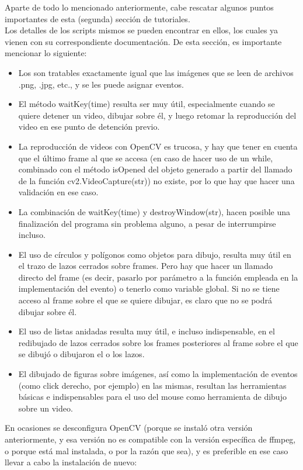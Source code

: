 \documentclass[letter]{article}
\begin{document}
Aparte de todo lo mencionado anteriormente, cabe rescatar algunos puntos importantes de esta (segunda) sección de tutoriales.\\
Los detalles de los scripts mismos se pueden encontrar en ellos, los cuales ya vienen con su correspondiente documentación. De esta sección, es importante mencionar lo siguiente:
\begin{itemize}
\item Los son tratables exactamente igual que las imágenes que se leen de archivos .png, .jpg, etc., y se les puede asignar eventos.
\item El método waitKey(time) resulta ser muy útil, especialmente cuando se quiere detener un video, dibujar sobre él, y luego retomar la reproducción del video en ese punto de detención previo.
\item La reproducción de videos con OpenCV es trucosa, y hay que tener en cuenta que el último frame al que se accesa (en caso de hacer uso de un while, combinado con el método isOpened del objeto generado a partir del llamado de la función cv2.VideoCapture(str)) no existe, por lo que hay que hacer una validación en ese caso.
\item La combinación de waitKey(time) y destroyWindow(str), hacen posible una finalización del programa sin problema alguno, a pesar de interrumpirse incluso.
\item El uso de círculos y polígonos como objetos para dibujo, resulta muy útil en el trazo de lazos cerrados sobre frames. Pero hay que hacer un llamado directo del frame (es decir, pasarlo por parámetro a la función empleada en la implementación del evento) o tenerlo como variable global. Si no se tiene acceso al frame sobre el que se quiere dibujar, es claro que no se podrá dibujar sobre él.
\item El uso de listas anidadas resulta muy útil, e incluso indispensable, en el redibujado de lazos cerrados sobre los frames posteriores al frame sobre el que se dibujó o dibujaron el o los lazos.
\item El dibujado de figuras sobre imágenes, así como la implementación de eventos (como click derecho, por ejemplo) en las mismas, resultan las herramientas básicas e indispensables para el uso del mouse como herramienta de dibujo sobre un video.
\end{itemize}

En ocasiones se desconfigura OpenCV (porque se instaló otra versión anteriormente, y esa versión no es compatible con la versión específica de ffmpeg, o porque está mal instalada, o por la razón que sea), y es preferible en ese caso llevar a cabo la instalación de nuevo:
\end{document}
